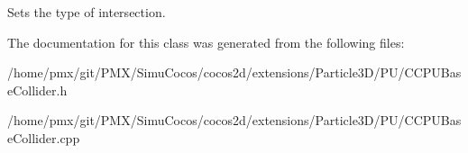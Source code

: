 Sets the type of intersection. 

The documentation for this class was generated from the following files\+:\begin{DoxyCompactItemize}
\item 
/home/pmx/git/\+P\+M\+X/\+Simu\+Cocos/cocos2d/extensions/\+Particle3\+D/\+P\+U/C\+C\+P\+U\+Base\+Collider.\+h\item 
/home/pmx/git/\+P\+M\+X/\+Simu\+Cocos/cocos2d/extensions/\+Particle3\+D/\+P\+U/C\+C\+P\+U\+Base\+Collider.\+cpp\end{DoxyCompactItemize}
